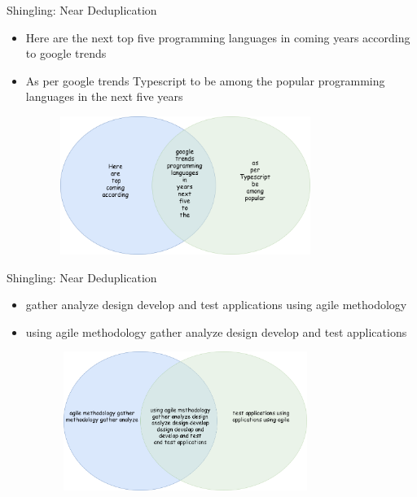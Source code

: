 \documentclass[9pt]{beamer}
\begin{document}

\begin{frame}{Shingling: Near Deduplication}
  \begin{itemize}
  \item Here are the next top five programming languages in coming years according to google trends
  \item As per google trends Typescript to be among the popular programming languages in the next five years
  \end{itemize}
  \pause
  \begin{figure}
    \includegraphics[width=9.5cm,height=4.5cm]{img/bagofwordsintersect2.png}
  \end{figure}
\end{frame}


\begin{frame}{Shingling: Near Deduplication}
  \begin{itemize}
  \item gather analyze design develop and test applications using agile methodology
  \item using agile methodology gather analyze design develop and test applications
  \end{itemize}
  \pause
  \begin{figure}
    \includegraphics[width=9.5cm,height=4.5cm]{img/shinglesintersect1.png}
  \end{figure}
\end{frame}
\end{document}
